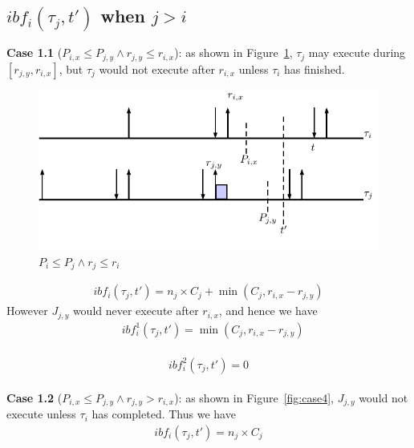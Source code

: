 


% 
\subsection{$ibf_i(\tau_j,t')$ when $j> i$}
 
\textbf{Case 1.1} ($P_{i,x}\leq P_{j,y}\wedge r_{j,y}\leq r_{i,x}$): as shown in  Figure~\ref{fig:case3}, $\tau_j$ may execute during $[r_{j,y},r_{i,x}]$, but $\tau_j$ would not execute after $r_{i,x}$  unless $\tau_i$ has finished.

	\begin{figure}[h!]
 \centering
\includegraphics[scale=0.7]{Figure/C3}  
\caption{$P_i\leq P_j\wedge r_j\leq r_i$}
  \label{fig:case3}
\end{figure}
		\begin{align*}
		ibf_i(\tau_j,t')=n_j\times C_j+\min(C_j,r_{i,x}-r_{j,y})
	\end{align*}
However $J_{j,y}$ would never execute after $r_{i,x}$, and hence we have
\begin{align*}
&ibf_{i}^1(\tau_j,t')=\min(C_j,r_{i,x}-r_{j,y})
\end{align*}


\begin{align*}
\begin{split}
ibf_{i}^2(\tau_j,t')=0
\end{split}
\end{align*}


\textbf{Case 1.2} ($P_{i,x}\leq P_{j,y}\wedge r_{j,y}> r_{i,x}$): as shown in  Figure~\ref{fig:case4},  $J_{j,y}$ would not execute unless $\tau_i$ has completed. Thus we have
\begin{align*}
		ibf_i(\tau_j,t')=n_j\times C_j
\end{align*}

